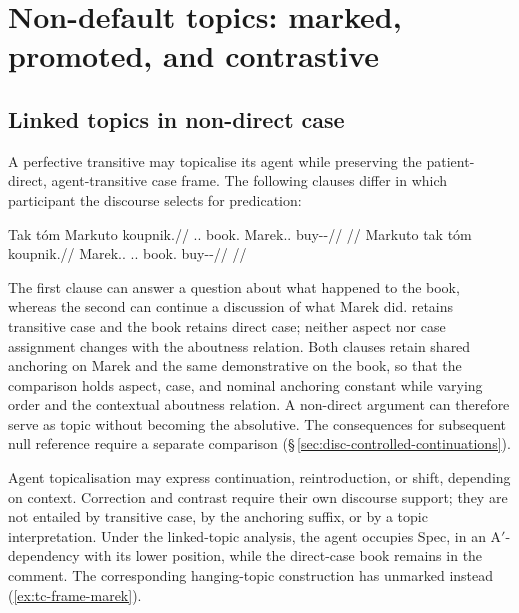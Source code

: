 \section{Non-default topics: marked, promoted, and contrastive}\label{sec:tc-nondefault}
\subsection{Linked topics in non-direct case}\label{sec:tc-marked-topics}

A perfective transitive may topicalise its agent while preserving the
 patient-direct, agent-transitive case frame. The following clauses differ
 in which participant the discourse selects for predication:

\pex\label{ex:tc-marked-top}
\a\label{ex:tc-neutral-top}%
\begingl
\gla Tak tóm Markuto koupnik.//
\glb \Dem{}.\Prox{}.\Dir{} book.\Dir{} Marek.\Trs{}.\Def{} buy-\Trs{}-\Pf{}//
\glft {}
      //
\endgl
\a\label{ex:tc-marked-agent-top}%
\begingl
\gla Markuto tak tóm koupnik.//
\glb Marek.\Trs{}.\Def{} \Dem{}.\Prox{}.\Dir{} book.\Dir{} buy-\Trs{}-\Pf{}//
\glft {}
      //
\endgl
\xe

\noindent The first clause can answer a question about what happened to the
 book, whereas the second can continue a discussion of what Marek did.
  retains transitive case and the book retains direct case;
 neither aspect nor case assignment changes with the aboutness relation.
 Both clauses retain shared anchoring on Marek and the same demonstrative
 on the book, so that the comparison holds aspect, case, and nominal anchoring
 constant while varying order and the contextual aboutness relation. A
 non-direct argument can therefore serve as topic without becoming the
 absolutive. The consequences for subsequent null reference require a
 separate comparison (§\,\ref{sec:disc-controlled-continuations}).

Agent topicalisation may express continuation, reintroduction, or shift,
 depending on context. Correction and contrast require their own discourse
 support; they are not entailed by transitive case, by the anchoring suffix,
 or by a topic interpretation. Under the linked-topic analysis, the agent
 occupies Spec, in an A$'$-dependency with its lower position,
 while the direct-case book remains in the comment. The corresponding
 hanging-topic construction has unmarked  instead
 (\ref{ex:tc-frame-marek}).

